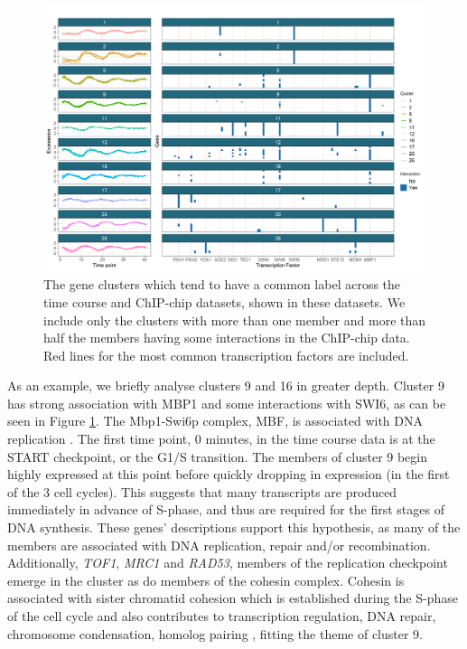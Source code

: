 \documentclass[12pt]{article}
\begin{document}
\begin{figure}
	\centering
	\includegraphics[scale=0.62]{./SupplementaryMaterial/Images/Yeast/timecourseChIPchipFused.png}
	\caption{The gene clusters which tend to have a common label across the time course and ChIP-chip datasets, shown in these datasets. We include only the clusters with more than one member and more than half the members having some interactions in the ChIP-chip data. Red lines for the most common transcription factors are included.}
	\label{fig:timepointChIPchipFused}
\end{figure}

As an example, we briefly analyse clusters 9 and 16 in greater depth. Cluster 9 has strong association with MBP1 and some interactions with SWI6, as can be seen in Figure \ref{fig:timepointChIPchipFused}. The Mbp1-Swi6p complex, MBF, is associated with DNA replication \citep{iyer2001genomic}. The first time point, 0 minutes, in the time course data is at the START checkpoint, or the G1/S transition. The members of cluster 9 begin highly expressed at this point before quickly dropping in expression (in the first of the 3 cell cycles). This suggests that many transcripts are produced immediately in advance of S-phase, and thus are required for the first stages of DNA synthesis. 
These genes' descriptions \citep[found using \texttt{org.Sc.sgd.db},][and shown in Table 3 of the Supplementary Material]{carlson2014org} support this hypothesis, as many of the members are associated with DNA replication, repair and/or recombination. Additionally, \emph{TOF1}, \emph{MRC1} and \emph{RAD53}, members of the replication checkpoint \citep{bando2009csm3, lao2018yeast} emerge in the cluster as do members of the cohesin complex. Cohesin is associated with sister chromatid cohesion which is established during the S-phase of the cell cycle \citep{toth1999yeast} and also contributes to transcription regulation, DNA repair, chromosome condensation, homolog pairing \citep{mehta2013cohesin}, fitting the theme of cluster 9.
\end{document}
